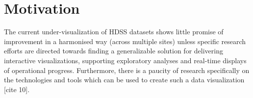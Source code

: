 \section{Motivation}

The current under-visualization of HDSS datasets shows little promise of improvement in a harmonised way (across multiple sites) unless specific research efforts are directed towards finding a generalizable solution for delivering interactive visualizations, supporting exploratory analyses and real-time displays of operational progress. Furthermore, there is a paucity of research specifically on the technologies and tools which can be used to create such a data visualization [cite 10].